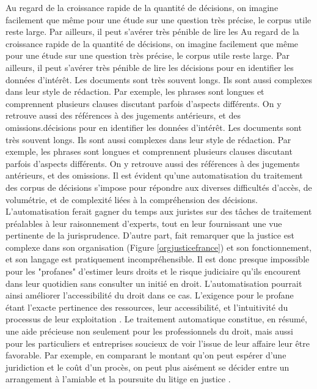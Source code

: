Au regard de la croissance rapide de la quantité de décisions, on imagine facilement que même pour une étude sur une question très précise, le corpus utile reste large. Par ailleurs, il peut s'avérer très pénible de lire les Au regard de la croissance rapide de la quantité de décisions, on imagine facilement que même pour une étude sur une question très précise, le corpus utile reste large. Par ailleurs, il peut s'avérer très pénible de lire les décisions pour en identifier les données d'intérêt. Les documents sont très souvent longs. Ils sont aussi complexes dans leur style de rédaction. Par exemple, les phrases sont longues et comprennent plusieurs clauses discutant parfois d'aspects différents. On y retrouve aussi des références à des jugements antérieurs, et des omissions.décisions pour en identifier les données d'intérêt. Les documents sont très souvent longs. Ils sont aussi complexes dans leur style de rédaction. Par exemple, les phrases sont longues et comprennent plusieurs clauses discutant parfois d'aspects différents. On y retrouve aussi des références à des jugements antérieurs, et des omissions.
Il est évident qu'une automatisation du traitement des corpus de décisions s'impose pour répondre aux diverses difficultés d'accès, de volumétrie, et de complexité liées à la compréhension des décisions. L'automatisation ferait gagner du temps aux juristes sur des tâches de traitement préalables à leur raisonnement d'experts, tout en leur fournissant une vue pertinente de la jurisprudence. D'autre part, \citet{cretin2014justicecomplexe} fait remarquer que la justice est complexe dans son organisation (Figure \ref{orgjusticefrance}) et son fonctionnement, et son langage est pratiquement incompréhensible. Il est donc presque impossible pour les "profanes" d'estimer leurs droits et le risque judiciaire qu'ils encourent dans leur quotidien sans consulter un initié en droit. L'automatisation pourrait ainsi améliorer l'accessibilité du droit dans ce cas.  L'exigence pour le profane étant l'exacte pertinence des ressources, leur accessibilité, et l'intuitivité du processus de leur exploitation \citep{narazenko2017legalnlpintro}. Le traitement automatique constitue, en résumé, une aide précieuse non seulement pour les professionnels du droit, mais aussi pour les particuliers et entreprises soucieux de voir l'issue de leur affaire leur être favorable. Par exemple, en comparant le montant qu'on peut espérer d'une juridiction et le coût d'un procès, on peut plus aisément se décider entre un arrangement à l'amiable et la poursuite du litige en justice \citep{langlaischappe2009ecoresolutionlitige}. 

